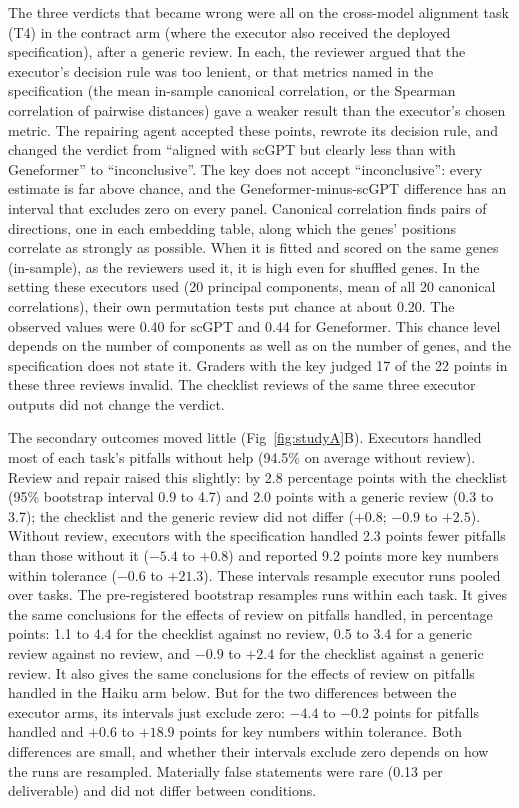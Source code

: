 \documentclass[10pt,letterpaper]{article}
\begin{document}
The three verdicts that became wrong were all on the cross-model
alignment task (T4) in the contract arm (where the executor also received
the deployed specification), after a generic review. In each,
the reviewer argued that the executor's decision rule was too lenient, or
that metrics named in the specification (the mean in-sample canonical
correlation, or the Spearman correlation of pairwise distances) gave a
weaker result than the executor's chosen metric. The repairing agent
accepted these points, rewrote its decision rule, and changed the verdict
from ``aligned with scGPT but clearly less than with Geneformer'' to
``inconclusive''. The key does not accept ``inconclusive'': every estimate
is far above chance, and the Geneformer-minus-scGPT difference has an
interval that excludes zero on every panel. Canonical correlation finds
pairs of directions, one in each embedding table, along which the genes'
positions correlate as strongly as possible. When it is fitted and scored
on the same genes (in-sample), as the reviewers used it, it is high even
for shuffled genes.
In the setting these executors used (20 principal components, mean of all
20 canonical correlations), their own permutation tests put chance at
about 0.20. The observed values were 0.40 for scGPT and 0.44 for
Geneformer. This chance level depends on the number of components as well
as on the number of genes, and the specification does not state it.
Graders with the key judged 17 of the 22 points in these three reviews
invalid. The checklist reviews of the same three executor outputs
did not change the verdict.

The secondary outcomes moved little (Fig~\ref{fig:studyA}B). Executors
handled most of each task's pitfalls without help (94.5\% on average
without review). Review and repair raised this slightly: by 2.8
percentage points with the checklist (95\% bootstrap interval 0.9 to 4.7)
and 2.0 points with a generic review (0.3 to 3.7); the checklist and the
generic review did not differ ($+0.8$; $-0.9$ to $+2.5$). Without review,
executors with the specification handled 2.3 points fewer pitfalls than
those without it ($-5.4$ to $+0.8$) and reported 9.2 points more key
numbers within tolerance ($-0.6$ to $+21.3$). These intervals resample
executor runs pooled over tasks. The pre-registered bootstrap resamples
runs within each task. It gives the same conclusions for the effects of
review on pitfalls handled, in percentage points: 1.1 to 4.4 for the
checklist against no review, 0.5 to 3.4 for a generic review against no
review, and $-0.9$ to $+2.4$ for the checklist against a generic review.
It also gives the same conclusions for the effects of review on pitfalls
handled in the Haiku arm below. But for the two differences between the
executor arms, its intervals just exclude zero: $-4.4$ to $-0.2$ points
for pitfalls handled and $+0.6$ to $+18.9$ points for key numbers within
tolerance. Both
differences are small, and whether their intervals exclude zero depends on
how the runs are resampled. Materially false statements were rare (0.13
per deliverable) and did not differ between conditions.
\end{document}
